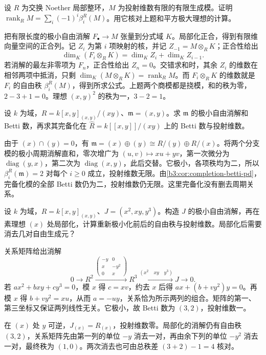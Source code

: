 \begin{exercise}\label{b3:ex:17-rank-euler}
	设 \(R\) 为交换 Noether 局部整环，\(M\) 为投射维数有限的有限生成模。证明 \(\operatorname{rank}_RM=\sum_i(-1)^i\beta_i^R(M)\)。用它核对上题和平方极大理想的计算。
\end{exercise}
\begin{solution}
	把有限长度的极小自由消解 \(F_\bullet\to M\) 张量到分式域 \(K\)。局部化正合，得到有限维向量空间的正合列。记 \(Z_i\) 为第 \(i\) 项映射的核，并记 \(Z_{-1}=M\otimes_RK\)；正合性给出
	\[
		\dim_K(F_i\otimes_RK)=\dim_K Z_i+\dim_K Z_{i-1}.
	\]
	若消解的最左非零项为 \(F_n\)，正合性给出 \(Z_n=0\)。交错求和时，其余 \(Z_i\) 的维数在相邻两项中抵消，只剩 \(\dim_K(M\otimes_RK)=\operatorname{rank}_RM\)。而 \(F_i\otimes_RK\) 的维数就是 \(F_i\) 的自由秩 \(\beta_i^R(M)\)，得到所求公式。上题两个商模都是挠模，和的秩为零，\(2-3+1=0\)。理想 \((x,y)^2\) 的秩为一，\(3-2=1\)。
\end{solution}

\begin{exercise}\label{b3:ex:17-completion-betti}
	设 \(k\) 为域，\(R=k[x,y]_{(x,y)}/(xy)\)、\(\mathfrak m=(x,y)\)。求 \(\mathfrak m\) 的极小自由消解和 Betti 数，再求其完备化在 \(\widehat R=k[\![x,y]\!]/(xy)\) 上的 Betti 数与投射维数。
\end{exercise}
\begin{solution}
	由于 \((x)\cap(y)=0\)，有 \(\mathfrak m=(x)\oplus(y)\cong R/(y)\oplus R/(x)\)。将两个分支模的极小周期消解直和，零次增广为 \((u,v)\mapsto xu+yv\)，第一次微分为 \(\operatorname{diag}(y,x)\)，第二次为 \(\operatorname{diag}(x,y)\)，此后交替。它极小，各项秩均为二，所以 \(\beta_i^R(\mathfrak m)=2\) 对每个 \(i\ge0\) 成立，投射维数无限。由\cref{b3:cor:completion-betti-pd}，完备化模的全部 Betti 数仍为二，投射维数仍无限。这里完备化没有删去周期关系。
\end{solution}

\begin{exercise}\label{b3:ex:17-localization-pd-drop}
	设 \(k\) 为域，\(R=k[x,y]_{(x,y)}\)、\(J=(x^2,xy,y^3)\)。构造 \(J\) 的极小自由消解，再在素理想 \((x)\) 处局部化，计算重新极小化前后的自由秩与投射维数。局部化后需要消去几对自由生成元？
\end{exercise}
\begin{solution}
	关系矩阵给出消解
	\[
		0\longrightarrow R^2
		\xrightarrow{\left(\begin{smallmatrix}-y&0\\x&-y^2\\0&x\end{smallmatrix}\right)}
		R^3\xrightarrow{(x^2\quad xy\quad y^3)}J\longrightarrow0.
	\]
	若 \(ax^2+bxy+cy^3=0\)，模 \(x\) 得 \(c=xv\)，约去 \(x\) 后得 \(ax+(b+vy^2)y=0\)。再模 \(x\) 得 \(b+vy^2=xu\)，从而 \(a=-uy\)，关系恰为所示两列的组合。矩阵的第一、第三坐标又保证两列线性无关。它极小，故 Betti 数为 \((3,2)\)，投射维数一。

	在 \((x)\) 处 \(y\) 可逆，\(J_{(x)}=R_{(x)}\)，投射维数零。局部化的消解仍有自由秩 \((3,2)\)，关系矩阵先由第一列的单位 \(-y\) 消去一对，再由余下列的单位 \(-y^2\) 消去一对，最终秩为 \((1,0)\)。两次消去也可由总秩差 \((3+2)-1=4\) 核对。
\end{solution}

